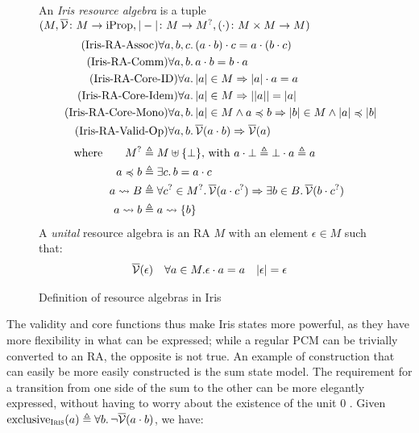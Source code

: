\begin{figure}
An \emph{Iris resource algebra} is a tuple $(M, \irisval\colon M\rarr \text{iProp}, |-|\colon M\rarr M^?, (\cdot)\colon M\times M\rarr M)$
\begin{align}
	\tag{Iris-RA-Assoc}
	\forall a,b,c&\ldotp (a\cdot b)\cdot c = a\cdot (b\cdot c)\\
	\tag{Iris-RA-Comm}
	\forall a,b&\ldotp a\cdot b = b\cdot a\\
	\tag{Iris-RA-Core-ID}
	\forall a&\ldotp |a| \in M \Rarr |a|\cdot a = a\\
	\tag{Iris-RA-Core-Idem}
	\forall a&\ldotp |a|\in M\Rarr ||a|| = |a|\\
	\tag{Iris-RA-Core-Mono}
	\forall a,b&\ldotp |a|\in M\land a\preo b \Rarr |b| \in M \land |a| \preo |b|\\
	\tag{Iris-RA-Valid-Op}\label{eq:iris-ra-valid-op}
	\forall a,b&\ldotp \irisval(a\cdot b)\Rarr \irisval(a)
\end{align}
\begin{align*}
	\text{where}\qquad
	M^? &\defeq M \uplus \{\bot\}\text{, with }a\cdot \bot \defeq \bot\cdot a\defeq a\\
	a \preo b &\defeq \exists c\ldotp b = a\cdot c\\
	a \rightsquigarrow B &\defeq \forall c^? \in M^?\ldotp \irisval(a\cdot c^?) \Rarr \exists b\in B\ldotp \irisval(b\cdot c^?)\\
	a \rightsquigarrow b &\defeq a \rightsquigarrow \{b\}
\end{align*}
A \emph{unital} resource algebra is an RA $M$ with an element $\epsilon\in M$ such that:
\begin{align*}
	\irisval(\epsilon) &&
	\forall a\in M. \epsilon\cdot a = a&&
	|\epsilon|=\epsilon
\end{align*}
\caption{Definition of resource algebras in Iris}
\label{fig:irisra-properties}
\end{figure}

The validity and core functions thus make Iris states more powerful, as they have more flexibility in what can be expressed; while a regular PCM can be trivially converted to an RA, the opposite is not true. An example of construction that can easily be more easily constructed is the sum state model. The requirement for a transition from one side of the sum to the other can be more elegantly expressed, without having to worry about the existence of the unit $0$ \cite{iris}. Given ${\text{exclusive}_\Iris(a)\defeq \forall b\ldotp \neg\irisval(a\cdot b)}$, we have:\begin{mathpar}
\end{mathpar}

